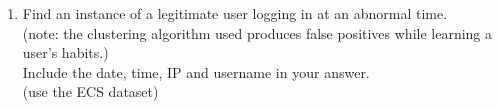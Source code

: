 \begin{enumerate}
{(note: the clustering algorithm used produces false positives while learning a user's habits.)\\
Include the date, time, IP and username in your answer.\\
(use the Honeynet dataset)}
\item{Find an instance of a legitimate user logging in at an abnormal time.\\
(note: the clustering algorithm used produces false positives while learning a user's habits.)\\
Include the date, time, IP and username in your answer.\\
(use the ECS dataset)}
\end{enumerate}